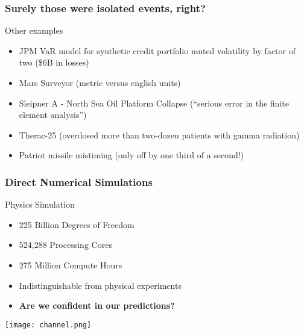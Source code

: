 \documentclass[mathserif]{beamer}
\begin{document}


 \begin{frame}
   \frametitle{Surely those were isolated events, right?}
  \begin{block}{Other examples}
    \begin{itemize}
    \item JPM VaR model for synthetic credit portfolio muted volatility by factor of two (\$6B in losses)
    \item Mars Surveyor (metric versus english units)
    \item Sleipner A - North Sea Oil Platform Collapse (``serious error in the finite element analysis'')
    \item Therac-25 (overdosed more than two-dozen patients with gamma radiation)
    \item Patriot missile mistiming (only off by one third of a second!)
    \end{itemize}
    \end{block}
 \end{frame}

\begin{frame}
  \frametitle{Direct Numerical Simulations}

      \begin{block}{Physics Simulation}
        \begin{itemize}
	 \item 225 Billion Degrees of Freedom
	 \item 524,288 Processing Cores
	 \item 275 Million Compute Hours
	 \item Indistinguishable from physical experiments

	 \item {\bf Are we confident in our predictions?}
        \end{itemize}
      \end{block}
 \begin{center}
  \center
  \texttt{[image: channel.png]}\\
 \end{center}
\end{frame}
\end{document}
